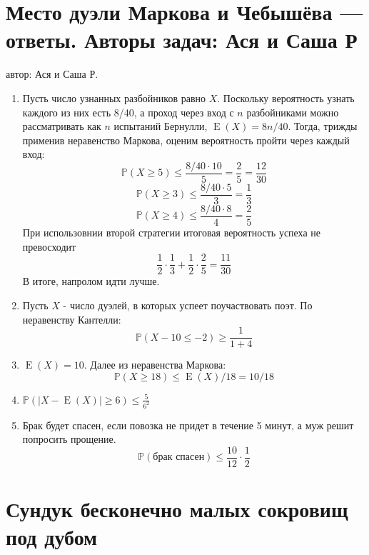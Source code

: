 \documentclass[a4paper,12pt]{article}
\DeclareMathOperator{\E}{E}
\def \P{\mathbb{P}}
\begin{document}
\section{Место дуэли Маркова и Чебышёва — ответы. Авторы задач: Ася и Саша Р}
автор: Ася и Саша Р.

\begin{enumerate}
\item Пусть число узнанных разбойников равно $X$. Поскольку вероятность узнать каждого из них есть 8/40, а проход через вход с $n$ разбойниками можно рассматривать как $n$ испытаний Бернулли, $\E(X)=8n/40$. Тогда, трижды применив неравенство Маркова, оценим вероятность пройти через каждый вход:
\[\P(X\geq5)\leq \frac{8/40\cdot10}{5}=\frac{2}{5}=\frac{12}{30}\]
\[\P(X\geq3)\leq \frac{8/40\cdot5}{3}=\frac{1}{3}\]
\[\P(X\geq4)\leq \frac{8/40\cdot8}{4}=\frac{2}{5}\]
При использовнии второй стратегии итоговая вероятность успеха не превосходит
\[\frac{1}{2}\cdot\frac{1}{3}+\frac{1}{2}\cdot\frac{2}{5}=\frac{11}{30}\]
В итоге, напролом идти лучше.
\item Пусть $X$ - число дуэлей, в которых успеет поучаствовать поэт.
По неравенству Кантелли:
\[
\P(X-10\leq -2) \geq \frac{1}{1+4}
\]
\item $\E(X) = 10$. Далее из неравенства Маркова:
\[
\P(X\geq18)\leq \E(X)/18=10/18
\]
\item
$\P(|X - \E(X)|\geq 6)\leq \frac{5}{6^2}$
\item Брак будет спасен, если повозка не придет в течение 5 минут, а муж решит попросить прощение.
\[
\P(\text{брак спасен})\leq \frac{10}{12}\cdot \frac{1}{2}
\]

\end{enumerate}


\newpage
\section{Сундук бесконечно малых сокровищ под дубом} %
\end{document}
